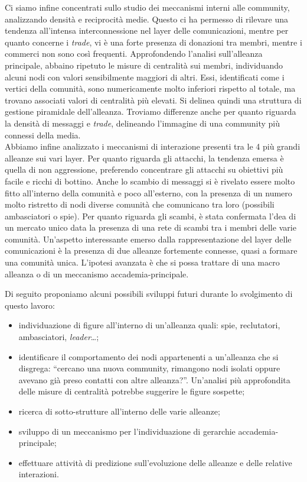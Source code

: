 Ci siamo infine concentrati sullo studio dei meccanismi interni alle community, analizzando densità e reciprocità medie. Questo ci ha permesso di rilevare una tendenza all'intensa interconnessione nel layer delle comunicazioni, mentre per quanto concerne i \textit{trade}, vi è una forte presenza di donazioni tra membri, mentre i commerci non sono così frequenti.
Approfondendo l'analisi sull'alleanza principale, abbaino ripetuto le misure di centralità sui membri, individuando alcuni nodi con valori sensibilmente maggiori di altri. Essi, identificati come i vertici della comunità, sono numericamente molto inferiori rispetto al totale, ma trovano associati valori di centralità più elevati. Si delinea quindi una struttura di gestione piramidale dell'alleanza. Troviamo differenze anche per quanto riguarda la densità di messaggi e \textit{trade}, delineando l'immagine di una community più connessi della media.\\
Abbiamo infine analizzato i meccanismi di interazione presenti tra le 4 più grandi alleanze sui vari layer. Per quanto riguarda gli attacchi, la tendenza emersa è quella di non aggressione, preferendo concentrare gli attacchi su obiettivi più facile e ricchi di bottino. Anche lo scambio di messaggi si è rivelato essere molto fitto all'interno della comunità e poco all'esterno, con la presenza di un numero molto ristretto di nodi diverse comunità che comunicano tra loro (possibili ambasciatori o spie). Per quanto riguarda gli scambi, è stata confermata l'dea di un mercato unico data la presenza di una rete di scambi tra i membri delle varie comunità. Un'aspetto interessante emerso dalla rappresentazione del layer delle comunicazioni è la presenza di due alleanze fortemente connesse, quasi a formare una comunità unica. L'ipotesi avanzata è che si possa trattare di una macro alleanza o di un meccanismo accademia-principale.

Di seguito proponiamo alcuni possibili sviluppi futuri durante lo svolgimento di questo lavoro:
\begin{itemize}
	\item individuazione di figure all'interno di un'alleanza quali: spie, reclutatori, ambasciatori, \textit{leader}\dots;
	\item identificare il comportamento dei nodi appartenenti a un'alleanza che si disgrega: “cercano una nuova community, rimangono nodi isolati oppure avevano già preso contatti con altre alleanza?”. Un'analisi più approfondita delle misure di centralità potrebbe suggerire le figure sospette;
	\item ricerca di sotto-strutture all'interno delle varie alleanze;
	\item sviluppo di un meccanismo per l'individuazione di gerarchie accademia-principale;
	\item effettuare attività di predizione sull'evoluzione delle alleanze e delle relative interazioni.
\end{itemize}

